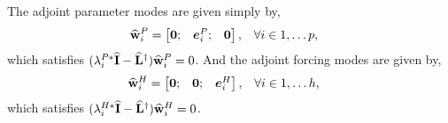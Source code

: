 The adjoint parameter modes are given simply by,
\begin{align}
	\label{eqn:adjoint_pmode} 
	\widehat{\mathbf{w}}^{P}_{i} &= \begin{bmatrix}
		\mathbf{0}; &
		\boldsymbol{e}^{P}_{i}; &
		\mathbf{0}
	\end{bmatrix}, && \forall i \in 1,\ldots p,
\end{align}
which satisfies $(\lambda^{P*}_{i}\mathbf{\widehat{I}} - \mathbf{\widehat{L}}^{\dagger})\widehat{\mathbf{w}}^{P}_{i} = 0$. And the adjoint forcing modes are given by,
\begin{align}
	\label{eqn:adjoint_hmode} 
	\widehat{\mathbf{w}}^{H}_{i} &= \begin{bmatrix}
		\mathbf{0}; &
		\mathbf{0}; &
		\boldsymbol{e}^{H}_{i}
	\end{bmatrix}, && \forall i \in 1,\ldots h,
\end{align}
which satisfies $(\lambda^{H*}_{i}\mathbf{\widehat{I}} - \mathbf{\widehat{L}}^{\dagger})\widehat{\mathbf{w}}^{H}_{i} = 0$. 

